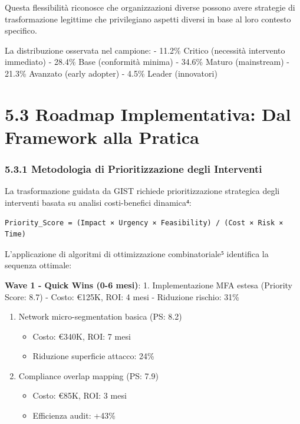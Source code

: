 \documentclass{report}
\providecommand{\tightlist}{%
  \setlength{\itemsep}{0pt}\setlength{\parskip}{0pt}
}
\begin{document}
Questa flessibilità riconosce che organizzazioni diverse possono avere
strategie di trasformazione legittime che privilegiano aspetti diversi
in base al loro contesto specifico.

La distribuzione osservata nel campione: - 11.2\% Critico (necessità
intervento immediato) - 28.4\% Base (conformità minima) - 34.6\% Maturo
(mainstream) - 21.3\% Avanzato (early adopter) - 4.5\% Leader
(innovatori)

\section{5.3 Roadmap Implementativa: Dal Framework alla
Pratica}\label{roadmap-implementativa-dal-framework-alla-pratica}

\subsubsection{5.3.1 Metodologia di Prioritizzazione degli
Interventi}\label{metodologia-di-prioritizzazione-degli-interventi}

La trasformazione guidata da GIST richiede prioritizzazione strategica
degli interventi basata su analisi costi-benefici dinamica⁴:

\begin{verbatim}
Priority_Score = (Impact × Urgency × Feasibility) / (Cost × Risk × Time)
\end{verbatim}

L'applicazione di algoritmi di ottimizzazione combinatoriale⁵ identifica
la sequenza ottimale:

\textbf{Wave 1 - Quick Wins (0-6 mesi)}: 1. Implementazione MFA estesa
(Priority Score: 8.7) - Costo: €125K, ROI: 4 mesi - Riduzione rischio:
31\%

\begin{enumerate}
\def\labelenumi{\arabic{enumi}.}
\setcounter{enumi}{1}
\tightlist
\item
  Network micro-segmentation basica (PS: 8.2)

  \begin{itemize}
  \tightlist
  \item
    Costo: €340K, ROI: 7 mesi
  \item
    Riduzione superficie attacco: 24\%
  \end{itemize}
\item
  Compliance overlap mapping (PS: 7.9)

  \begin{itemize}
  \tightlist
  \item
    Costo: €85K, ROI: 3 mesi
  \item
    Efficienza audit: +43\%
  \end{itemize}
\end{enumerate}
\end{document}
